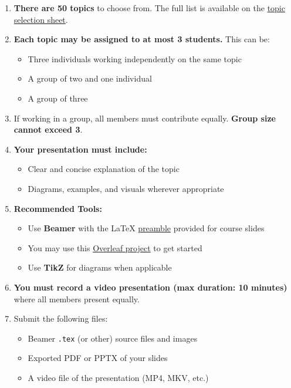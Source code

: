 \documentclass[10pt,answers]{exam}
\begin{document}
\begin{enumerate}[leftmargin=0.6cm]
  \item \textbf{There are 50 topics} to choose from. The full list is available on the \href{https://docs.google.com/spreadsheets/d/1u53Q3IpKolDNdgppDxxXberWJHSxwfAub1AxBailzJA/edit?usp=sharing}{topic selection sheet}.
  \item \textbf{Each topic may be assigned to at most 3 students.} This can be:
    \begin{itemize}
      \item Three individuals working independently on the same topic
      \item A group of two and one individual
      \item A group of three
    \end{itemize}
  \item If working in a group, all members must contribute equally. \textbf{Group size cannot exceed 3}.

  \item \textbf{Your presentation must include:}
    \begin{itemize}
      \item Clear and concise explanation of the topic
      \item Diagrams, examples, and visuals wherever appropriate
    \end{itemize}

  \item \textbf{Recommended Tools:}
    \begin{itemize}
      \item Use \textbf{Beamer} with the LaTeX \href{https://github.com/risenfromashes/cse409-resources}{preamble} provided for course slides
      \item You may use this \href{https://www.overleaf.com/read/sfqpwxcdrpny#497ff0}{Overleaf project} to get started
      \item Use \textbf{TikZ} for diagrams when applicable
    \end{itemize}

  \item \textbf{You must record a video presentation (max duration: 10 minutes)} where all members present equally.

  \item Submit the following files:
    \begin{itemize}
      \item Beamer \texttt{.tex} (or other) source files and images
      \item Exported PDF or PPTX of your slides
      \item A video file of the presentation (MP4, MKV, etc.)
    \end{itemize}


\end{enumerate}
\end{document}
